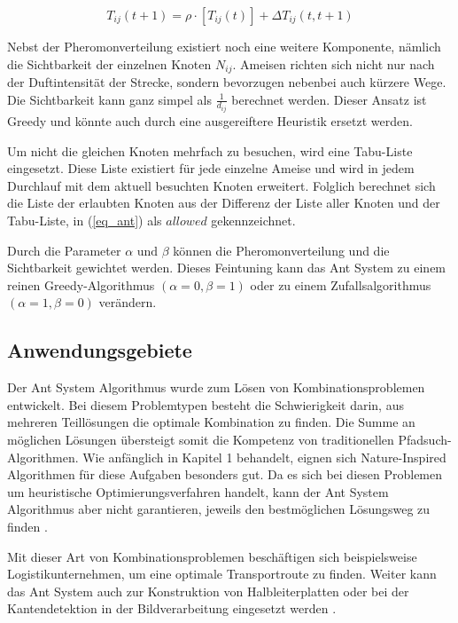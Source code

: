 \begin{equation}
    \label{eq_pheromon}
    T_{ij}(t + 1) = \rho \cdot [T_{ij}(t)] + \Delta T_{ij}(t, t+1)
\end{equation}
\label{eq_pheromon1}

Nebst der Pheromonverteilung existiert noch eine weitere Komponente, nämlich die Sichtbarkeit der einzelnen
Knoten $N_{ij}$. Ameisen richten sich nicht nur nach der Duftintensität der Strecke, sondern bevorzugen
nebenbei auch kürzere Wege. Die Sichtbarkeit kann ganz simpel als $\frac{1}{d_{ij}}$ berechnet werden. Dieser
Ansatz ist Greedy \cite{Wiki04} und könnte auch durch eine ausgereiftere Heuristik ersetzt werden.

Um nicht die gleichen Knoten mehrfach zu besuchen, wird eine Tabu-Liste eingesetzt. Diese Liste existiert
für jede einzelne Ameise und wird in jedem Durchlauf mit dem aktuell besuchten Knoten erweitert. Folglich
berechnet sich die Liste der erlaubten Knoten aus der Differenz der Liste aller Knoten und der Tabu-Liste,
in (\ref{eq_ant}) als $allowed$ gekennzeichnet.

Durch die Parameter $\alpha \text{ und } \beta$ können die Pheromonverteilung und die Sichtbarkeit
gewichtet werden. Dieses Feintuning kann das Ant System zu einem reinen Greedy-Algorithmus
$(\alpha = 0, \beta = 1)$ oder zu einem Zufallsalgorithmus $(\alpha = 1, \beta = 0)$ verändern.


\subsection{Anwendungsgebiete}
Der Ant System Algorithmus wurde zum Lösen von Kombinationsproblemen entwickelt. Bei diesem Problemtypen
besteht die Schwierigkeit darin, aus mehreren Teillösungen die optimale Kombination zu finden. Die Summe
an möglichen Lösungen übersteigt somit die Kompetenz von traditionellen Pfadsuch-Algorithmen. Wie anfänglich
in Kapitel 1 behandelt, eignen sich Nature-Inspired Algorithmen für diese Aufgaben besonders gut. Da es
sich bei diesen Problemen um heuristische Optimierungsverfahren handelt, kann der Ant System Algorithmus
aber nicht garantieren, jeweils den bestmöglichen Lösungsweg zu finden \cite{Wiki03}.

Mit dieser Art von Kombinationsproblemen beschäftigen sich beispielsweise Logistikunternehmen, um eine
optimale Transportroute zu finden. Weiter kann das Ant System auch zur Konstruktion von Halbleiterplatten
oder bei der Kantendetektion in der Bildverarbeitung eingesetzt werden \cite{Wiki07}.

